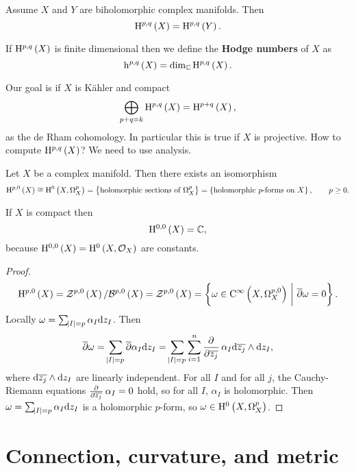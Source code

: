 \pagebreak

\begin{exercise*}
Assume $ X $ and $ Y $ are biholomorphic complex manifolds. Then
$$ \H^{p, q}\br{X} = \H^{p, q}\br{Y}. $$
\end{exercise*}

If $ \H^{p, q}\br{X} $ is finite dimensional then we define the \textbf{Hodge numbers} of $ X $ as
$$ \h^{p, q}\br{X} = \dim_\CC \H^{p, q}\br{X}. $$


Our goal is if $ X $ is K\"ahler and compact
$$ \bigoplus_{p + q = k} \H^{p, q}\br{X} = \H^{p + q}\br{X}, $$
as the de Rham cohomology. In particular this is true if $ X $ is projective. How to compute $ \H^{p, q}\br{X} $? We need to use analysis.

\begin{proposition}
Let $ X $ be a complex manifold. Then there exists an isomorphism
$$ \H^{p, 0}\br{X} \cong \H^0\br{X, \Omega_X^p} = \cbr{\text{holomorphic sections of} \ \Omega_X^p} = \cbr{\text{holomorphic $ p $-forms on} \ X}, \qquad p \ge 0. $$
\end{proposition}

\begin{remark*}
If $ X $ is compact then
$$ \H^{0, 0}\br{X} = \CC, $$
because $ \H^{0, 0}\br{X} = \H^0\br{X, \OOO_X} $ are constants.
\end{remark*}

\begin{proof}
$$ \H^{p, 0}\br{X} = \ZZZ^{p, 0}\br{X} / \BBB^{p, 0}\br{X} = \ZZZ^{p, 0}\br{X} = \cbr{\omega \in \CO{X}{p, 0} \st \dab\omega = 0}. $$
Locally $ \omega = \sum_{\abs{I} = p} \alpha_I\mathrm{d} z_I $. Then
$$ \dab\omega = \sum_{\abs{I} = p} \dab\alpha_I\d z_I = \sum_{\abs{I} = p} \sum_{i = 1}^n \dpd{}{\overline{z_j}}\alpha_I\d\overline{z_j} \wedge \d z_I, $$
where $ \mathrm{d}\overline{z_j} \wedge \mathrm{d} z_I $ are linearly independent. For all $ I $ and for all $ j $, the Cauchy-Riemann equations $ \tpd{}{\overline{z_j}}\alpha_I = 0 $ hold, so for all $ I $, $ \alpha_I $ is holomorphic. Then $ \omega = \sum_{\abs{I} = p} \alpha_I\mathrm{d} z_I $ is a holomorphic $ p $-form, so $ \omega \in \H^0\br{X, \Omega_X^p} $.
\end{proof}

\pagebreak

\section{Connection, curvature, and metric}

